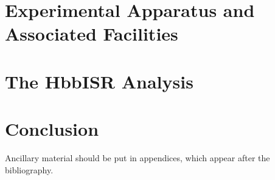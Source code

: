 \documentclass[11pt]{ucthesis}
\begin{document}


\part{Experimental Apparatus and Associated Facilities}





\part{The HbbISR Analysis}









\part{Conclusion}


\nocite{*}



\appendix



Ancillary material should be put in appendices, which appear after the
bibliography. 
\end{document}
